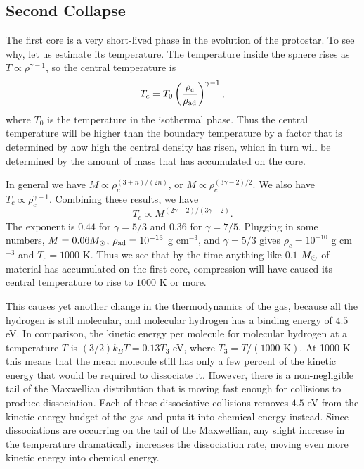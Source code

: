 \subsection{Second Collapse}

The first core is a very short-lived phase in the evolution of the protostar. To see why, let us estimate its temperature. The temperature inside the sphere rises as $T\propto \rho^{\gamma-1}$, so the central temperature is
\begin{equation}
T_c = T_0 \left(\frac{\rho_c}{\rho_{\rm ad}}\right)^{\gamma-1},
\end{equation}
where $T_0$ is the temperature in the isothermal phase. Thus the central temperature will be higher than the boundary temperature by a factor that is determined by how high the central density has risen, which in turn will be determined by the amount of mass that has accumulated on the core.

In general we have $M\propto \rho_c^{(3+n)/(2n)}$, or $M\propto \rho_c^{(3\gamma-2)/2}$. We also have $T_c\propto \rho_c^{\gamma-1}$. Combining these results, we have
\begin{equation}
T_c \propto M^{(2\gamma-2)/(3\gamma-2)}.
\end{equation}
The exponent is $0.44$ for $\gamma=5/3$ and $0.36$ for $\gamma=7/5$. Plugging in some numbers, $M = 0.06M_{\odot}$, $\rho_{\rm ad}=10^{-13}$ g cm$^{-3}$, and $\gamma=5/3$ gives $\rho_c = 10^{-10}$ g cm$^{-3}$ and $T_c=1000$ K. Thus we see that by the time anything like $0.1$ $M_{\odot}$ of material has accumulated on the first core, compression will have caused its central temperature to rise to $1000$ K or more.

This causes yet another change in the thermodynamics of the gas, because all the hydrogen is still molecular, and molecular hydrogen has a binding energy of $4.5$ eV. In comparison, the kinetic energy per molecule for molecular hydrogen at a temperature $T$ is $(3/2) k_B T = 0.13 T_3$ eV, where $T_3=T/(1000\mbox{ K})$. At 1000 K this means that the mean molecule still has only a few percent of the kinetic energy that would be required to dissociate it. However, there is a non-negligible tail of the Maxwellian distribution that is moving fast enough for collisions to produce dissociation. Each of these dissociative collisions removes $4.5$ eV from the kinetic energy budget of the gas and puts it into chemical energy instead. Since dissociations are occurring on the tail of the Maxwellian, any slight increase in the temperature dramatically increases the dissociation rate, moving even more kinetic energy into chemical energy.

